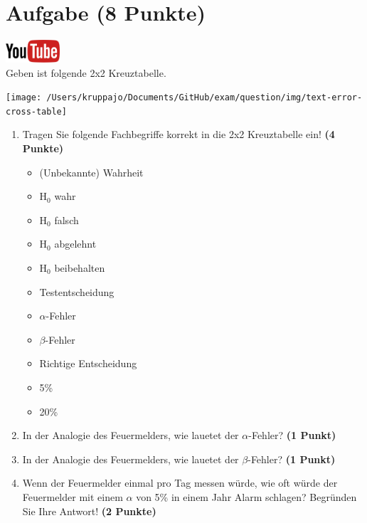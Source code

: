 \documentclass[a4paper, 10pt]{scrartcl}\usepackage[]{graphicx}\usepackage[]{xcolor}
\begin{document}
\section{Aufgabe \hfill (8 Punkte)}

\hfill\href{https://youtu.be/3DfWs9NNrCk}{\includegraphics[width =
  2cm]{img/youtube}}\\[1Ex]




Geben ist folgende 2x2 Kreuztabelle. 

\begin{center}
  \texttt{[image: /Users/kruppajo/Documents/GitHub/exam/question/img/text-error-cross-table]}
\end{center}

\begin{enumerate}
\item Tragen Sie folgende Fachbegriffe korrekt in die 2x2 Kreuztabelle ein! \textbf{(4 Punkte)}
  \begin{itemize}
  \item (Unbekannte) Wahrheit	
  \item H$_0$ wahr
  \item H$_0$ falsch
  \item H$_0$ abgelehnt
  \item H$_0$ beibehalten
  \item Testentscheidung
  \item $\alpha$-Fehler
  \item $\beta$-Fehler
  \item Richtige Entscheidung
  \item 5\%
  \item 20\%
  \end{itemize}
\item In der Analogie des Feuermelders, wie lauetet der $\alpha$-Fehler? \textbf{(1 Punkt)}
\item In der Analogie des Feuermelders, wie lauetet der $\beta$-Fehler? \textbf{(1 Punkt)}
\item Wenn der Feuermelder einmal pro Tag messen w{\"u}rde, wie oft w{\"u}rde der
  Feuermelder mit einem $\alpha$ von 5\% in einem Jahr Alarm schlagen?
  Begr{\"u}nden Sie Ihre Antwort! \textbf{(2 Punkte)}
\end{enumerate}
\end{document}
